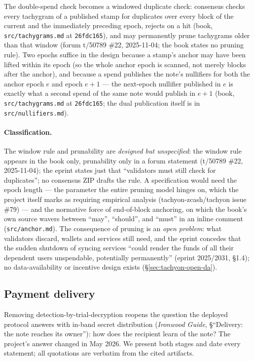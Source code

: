 \documentclass[11pt,a4paper]{article}
\theoremstyle{definition}
\begin{document}
The double-spend check becomes a windowed duplicate check: consensus checks
every tachygram of a published stamp for duplicates over every block of the
current and the immediately preceding epoch, rejects on a hit (book,
\texttt{src/tachygrams.md} at \texttt{26fdc165}), and may permanently
prune tachygrams older than that window (forum t/50789 \#22, 2025-11-04;
the book states no pruning rule). Two epochs suffice in the
design because a stamp's anchor may have been lifted within its epoch (so
the whole anchor epoch is scanned, not merely blocks after the anchor), and
because a spend publishes the note's nullifiers for both the anchor epoch
$e$ and epoch $e + 1$ --- the next-epoch nullifier published in $e$ is
exactly what a second spend of the same note would publish in $e + 1$
(book, \texttt{src/tachygrams.md} at \texttt{26fdc165}; the dual
publication itself is in \texttt{src/nullifiers.md}).

\paragraph{Classification.} The window rule and prunability are
\emph{designed but unspecified}: the window rule appears in the book only,
prunability only in a forum statement (t/50789 \#22, 2025-11-04); the
eprint states just that ``validators must still check for duplicates''; no
consensus ZIP drafts the rule. A specification would need the epoch length
--- the parameter the entire pruning model hinges on, which the project
itself marks as requiring empirical analysis (tachyon-zcash/tachyon issue
\#79) --- and the normative force of end-of-block anchoring, on which the
book's own source wavers between ``may'', ``should'', and ``must'' in an
inline comment (\texttt{src/anchor.md}). The consequence of
pruning is an \emph{open problem}: what validators discard, wallets and
services still need, and the eprint concedes that the sudden shutdown of
syncing services ``could render the funds of all their dependent users
unspendable, potentially permanently'' (eprint 2025/2031, \S1.4); no
data-availability or incentive design exists (\S\ref{sec:tachyon-open-da}).

\subsection{Payment delivery}\label{sec:tachyon-payments}

Removing detection-by-trial-decryption reopens the question the deployed
protocol answers with in-band secret distribution (\emph{Ironwood Guide},
\S``Delivery: the note reaches its owner''): how does the recipient learn of
the note? The project's
answer changed in May 2026. We present both stages and date every statement;
all quotations are verbatim from the cited artifacts.
\end{document}
